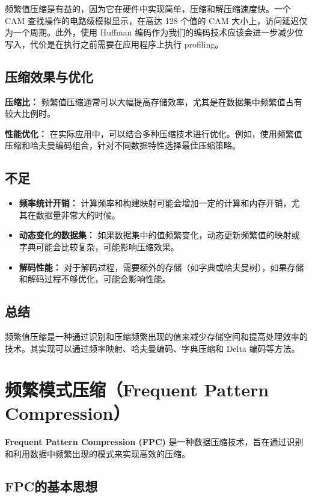 \documentclass[12pt]{article}
\begin{document}
频繁值压缩是有益的，因为它在硬件中实现简单，压缩和解压缩速度快。一个 CAM 查找操作的电路级模拟显示，在高达 128 个值的 CAM 大小上，访问延迟仅为一个周期。此外，使用 Huffman 编码作为我们的编码技术应该会进一步减少位写入，代价是在执行之前需要在应用程序上执行 profiling。

\subsection{压缩效果与优化}

\textbf{压缩比：} 频繁值压缩通常可以大幅提高存储效率，尤其是在数据集中频繁值占有较大比例时。

\textbf{性能优化：} 在实际应用中，可以结合多种压缩技术进行优化。例如，使用频繁值压缩和哈夫曼编码组合，针对不同数据特性选择最佳压缩策略。

\subsection{不足}
\begin{itemize}
  \item \textbf{频率统计开销：} 计算频率和构建映射可能会增加一定的计算和内存开销，尤其在数据量非常大的时候。
  \item \textbf{动态变化的数据集：} 如果数据集中的值频繁变化，动态更新频繁值的映射或字典可能会比较复杂，可能影响压缩效果。
  \item \textbf{解码性能：} 对于解码过程，需要额外的存储（如字典或哈夫曼树），如果存储和解码过程不够优化，可能会影响性能。
\end{itemize}

\subsection{总结}
频繁值压缩是一种通过识别和压缩频繁出现的值来减少存储空间和提高处理效率的技术。其实现可以通过频率映射、哈夫曼编码、字典压缩和 Delta 编码等方法。


\section{频繁模式压缩（Frequent Pattern Compression）}

\textbf{Frequent Pattern Compression (FPC)} 是一种数据压缩技术，旨在通过识别和利用数据中频繁出现的模式来实现高效的压缩。

\subsection{FPC的基本思想}
\end{document}
